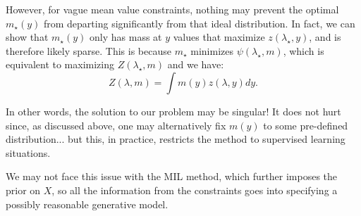 \documentclass[english]{scrartcl}
\begin{document}
However, for vague mean value constraints, nothing may prevent the
optimal $m_\star(y)$ from departing significantly from that ideal
distribution. In fact, we can show that $m_\star(y)$ only has mass at
$y$ values that maximize $z(\lambda_\star,y)$, and is therefore likely
sparse. This is because $m_\star$ minimizes $\psi(\lambda_\star,m)$,
which is equivalent to maximizing $Z(\lambda_\star,m)$ and we have:
$$
Z(\lambda, m) = \int m(y) z(\lambda, y) dy.
$$

In other words, the solution to our problem may be singular! It does
not hurt since, as discussed above, one may alternatively fix $m(y)$
to some pre-defined distribution... but this, in practice, restricts
the method to supervised learning situations.

We may not face this issue with the MIL method, which further imposes
the prior on $X$, so all the information from the constraints goes
into specifying a possibly reasonable generative model.






\end{document}
